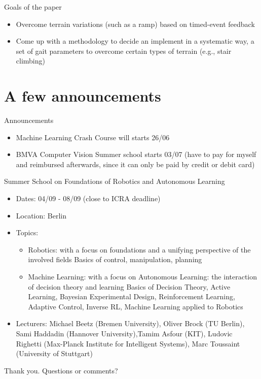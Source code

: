 \documentclass{beamer}
\begin{document}
\begin{frame}{Goals of the paper}
\begin{itemize}\setlength\itemsep{3em}
\item Overcome terrain variations (such as a ramp) based on timed-event feedback 
\item Come up with a methodology to decide an implement in a systematic way, a set of gait parameters to overcome certain types of terrain (e.g., stair climbing)
\end{itemize}
\end{frame}

\section{A few announcements}

\begin{frame}{Announcements}
\begin{itemize}\setlength\itemsep{3em}

\item Machine Learning Crash Course will starts 26/06
\item BMVA Computer Vision Summer school starts 03/07 (have to pay for myself and reimbursed afterwards, since it can only be paid by credit or debit card)
\end{itemize}
\end{frame}

\begin{frame}
 Summer School on Foundations of Robotics and Autonomous Learning 
\begin{itemize}
\item Dates: 04/09 - 08/09 (close to ICRA deadline)
\item Location: Berlin
\item Topics: 
\begin{itemize}
\item Robotics: with a focus on foundations and a unifying perspective of the involved fields
    Basics of control, manipulation, planning

\item Machine Learning: with a focus on Autonomous Learning: the interaction of decision theory and learning
    Basics of Decision Theory, Active Learning, Bayesian Experimental Design, Reinforcement Learning, Adaptive Control, Inverse RL, Machine Learning applied to Robotics
\end{itemize}
\item Lecturers: Michael Beetz (Bremen University), Oliver Brock (TU Berlin), Sami Haddadin (Hannover University),Tamim Asfour (KIT), Ludovic Righetti (Max-Planck Institute for Intelligent Systems), Marc Toussaint (University of Stuttgart) 
\end{itemize}
\end{frame}

\begin{frame}
 \hspace{2cm} Thank you. Questions or comments?
\end{frame}
\end{document}
